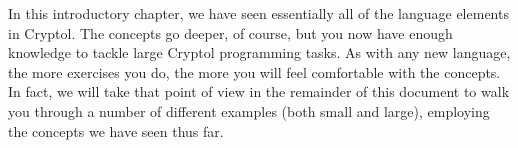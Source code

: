 In this introductory chapter, we have seen essentially all of the
language elements in Cryptol. The concepts go deeper, of course, but
you now have enough knowledge to tackle large Cryptol programming
tasks. As with any new language, the more exercises you do, the more
you will feel comfortable with the concepts. In fact, we will take
that point of view in the remainder of this document to walk you
through a number of different examples (both small and large),
employing the concepts we have seen thus far.

